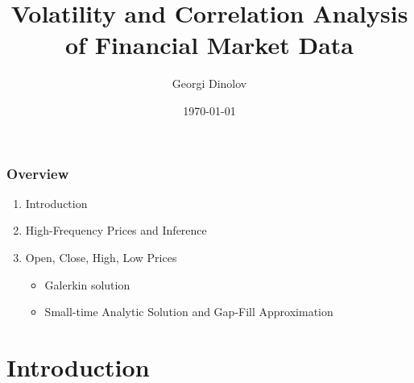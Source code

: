 \documentclass{beamer}
\title[]{Volatility and Correlation Analysis of Financial Market Data} %
\author{Georgi Dinolov} %
\institute[UCSC] %
{
  University of California, Santa Cruz \\ %
  Baskin School of Engineering \\
\medskip
\textit{gdinolov@soe.ucsc.edu} %
}
\date{\today} %
\begin{document}
\begin{frame}
\titlepage %
\end{frame}

\begin{frame}
\frametitle{Overview} %
\begin{enumerate}
\item Introduction
\item High-Frequency Prices and Inference
\item Open, Close, High, Low Prices
  \begin{itemize}
  \item Galerkin solution
  \item Small-time Analytic Solution and Gap-Fill Approximation
  \end{itemize}
\end{enumerate}
\end{frame}


\section{Introduction}
\end{document}

